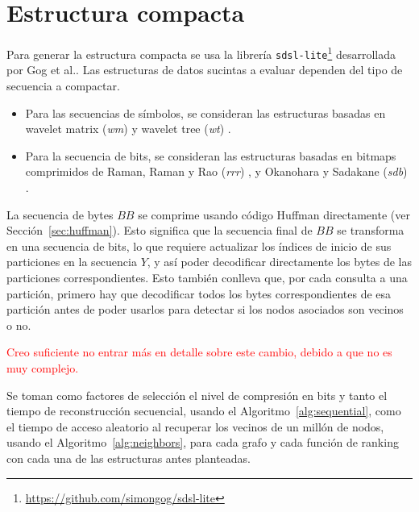 %


\section{Estructura compacta}

Para generar la estructura compacta se usa la librería \texttt{sdsl-lite}\footnote{\url{https://github.com/simongog/sdsl-lite}} desarrollada por Gog et al.\cite{gbmp2014sea}. Las estructuras de datos sucintas a evaluar dependen del tipo de secuencia a compactar.

\begin{itemize}
	\item Para las secuencias de símbolos, se consideran las estructuras basadas en wavelet matrix (\textit{wm}) \cite{claude2015wavelet} y wavelet tree (\textit{wt}) \cite{grossi2003high}.
	\item Para la secuencia de bits, se consideran las estructuras basadas en bitmaps comprimidos de Raman, Raman y Rao (\textit{rrr}) \cite{raman2002succinct}, y Okanohara y Sadakane (\textit{sdb}) \cite{DBLP:journals/corr/abs-cs-0610001}.
\end{itemize}

La secuencia de bytes $BB$ se comprime usando código Huffman\cite{huffman1952method} directamente (ver Sección~\ref{sec:huffman}). Esto significa que la secuencia final de $BB$ se transforma en una secuencia de bits, lo que requiere actualizar los índices de inicio de sus particiones en la secuencia $Y$, y así poder decodificar directamente los bytes de las particiones correspondientes. Esto también conlleva que, por cada consulta a una partición, primero hay que decodificar todos los bytes correspondientes de esa partición antes de poder usarlos para detectar si los nodos asociados son vecinos o no.

\textcolor{red}{Creo suficiente no entrar más en detalle sobre este cambio, debido a que no es muy complejo.}

Se toman como factores de selección el nivel de compresión en bits y tanto el tiempo de reconstrucción secuencial, usando el Algoritmo~\ref{alg:sequential}, como el tiempo de acceso aleatorio al recuperar los vecinos de un millón de nodos, usando el Algoritmo~\ref{alg:neighbors}, para cada grafo y cada función de ranking con cada una de las estructuras antes planteadas.

